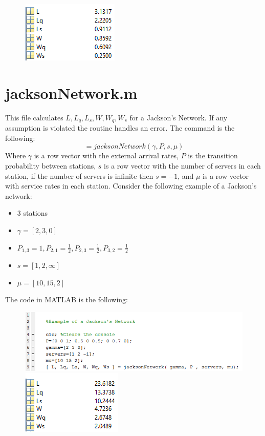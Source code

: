 \documentclass[•]{article}
\begin{document}
  \begin{center}
 \begin{figure}
 \includegraphics[scale=1]{ResultsExample1.png}
 \end{figure}
 \end{center}
 
 \section{jacksonNetwork.m}
 This file calculates $L,L_q,L_s,W,W_q,W_s$ for a Jackson's Network. If any assumption is violated the routine handles an error. The command is the following:
 \begin{equation}
 [L,L_q,L_s,W,W_q,W_s]=jacksonNetwork( \gamma, P , s, \mu)
 \end{equation}
 Where $\gamma$ is a row vector with the external arrival rates, $P$ is the transition probability between stations, $s$ is a row vector with the number of servers in each station, if the number of servers is infinite then $s=-1$, and $\mu$ is a row vector with service rates in each station. Consider the following example of a Jackson's network:
 \begin{itemize}
 \item 3 stations
 \item $\gamma = [2,3,0]$
 \item $P_{1,3}=1,  P_{2,1}=\frac{1}{2},P_{2,3}=\frac{1}{2} , P_{3,2} = \frac{1}{2}$
 \item $s=[1,2,\infty]$
 \item $\mu=[10,15,2]$
\end{itemize}
The code in MATLAB is the following:

 \begin{figure}
 \includegraphics[scale=0.8]{Example2.png}
 \includegraphics[scale=1]{ResultsExample2.png}
 \end{figure}
 
\end{document}
